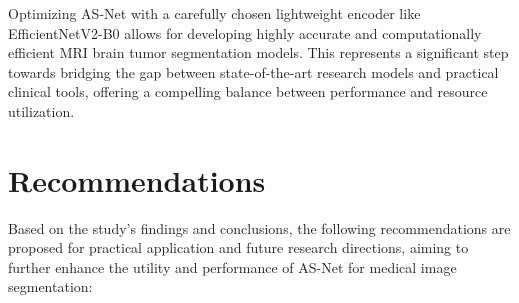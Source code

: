 Optimizing AS-Net with a carefully chosen lightweight encoder like EfficientNetV2-B0 allows for developing highly accurate and computationally efficient MRI brain tumor segmentation models. This represents a significant step towards bridging the gap between state-of-the-art research models and practical clinical tools, offering a compelling balance between performance and resource utilization.

\section{Recommendations}
Based on the study's findings and conclusions, the following recommendations are proposed for practical application and future research directions, aiming to further enhance the utility and performance of AS-Net for medical image segmentation:

